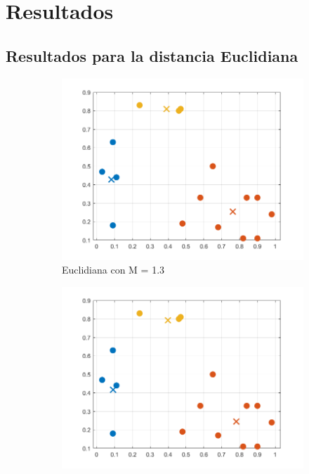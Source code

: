 \documentclass[11pt, letterpaper]{article}
\begin{document}
\newpage

\section{Resultados}

\subsection{Resultados para la distancia Euclidiana}

\begin{figure}[h!]
	\centering
	\begin{subfigure}[b]{0.50\textwidth}
		\includegraphics[width=\textwidth]{IMG/R11.png}
		\caption{Euclidiana con M = 1.3}
		\label{fig:r1}
	\end{subfigure}\hfill
	\begin{subfigure}[b]{0.50\textwidth}
		\includegraphics[width=\textwidth]{IMG/R12.png}

\end{subfigure}
\end{figure}
\end{document}
